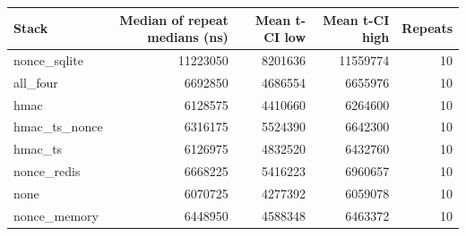 \begin{tabular}{lrrrr}\toprule
Stack & Median of repeat medians (ns) & Mean t-CI low & Mean t-CI high & Repeats \\
\midrule
nonce_sqlite & 11223050 & 8201636 & 11559774 & 10 \\
all_four & 6692850 & 4686554 & 6655976 & 10 \\
hmac & 6128575 & 4410660 & 6264600 & 10 \\
hmac_ts_nonce & 6316175 & 5524390 & 6642300 & 10 \\
hmac_ts & 6126975 & 4832520 & 6432760 & 10 \\
nonce_redis & 6668225 & 5416223 & 6960657 & 10 \\
none & 6070725 & 4277392 & 6059078 & 10 \\
nonce_memory & 6448950 & 4588348 & 6463372 & 10 \\
\bottomrule\end{tabular}
